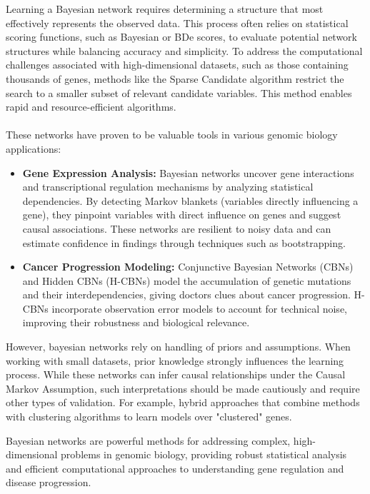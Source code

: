 Learning a Bayesian network requires determining a structure that most effectively represents the observed data.
This process often relies on statistical scoring functions, such as Bayesian or BDe scores, to evaluate potential network structures while balancing accuracy and simplicity.
To address the computational challenges associated with high-dimensional datasets, such as those containing thousands of genes, methods like the Sparse Candidate algorithm restrict the search to a smaller subset of relevant candidate variables.
This method enables rapid and resource-efficient algorithms\cite{friedman_using_2000}.
\\\\
These networks have proven to be valuable tools in various genomic biology applications:
\begin{itemize}
    \item \textbf{Gene Expression Analysis:} Bayesian networks uncover gene interactions and transcriptional regulation mechanisms by analyzing statistical dependencies.
        By detecting Markov blankets (variables directly influencing a gene), they pinpoint variables with direct influence on genes and suggest causal associations.
        These networks are resilient to noisy data and can estimate confidence in findings through techniques such as bootstrapping.
    \item \textbf{Cancer Progression Modeling:} Conjunctive Bayesian Networks (CBNs) and Hidden CBNs (H-CBNs) model the accumulation of genetic mutations and their interdependencies, giving doctors clues about cancer progression.
        H-CBNs incorporate observation error models to account for technical noise, improving their robustness and biological relevance.
\end{itemize}

\noindent However, bayesian networks rely on handling of priors and assumptions.
When working with small datasets, prior knowledge strongly influences the learning process.
While these networks can infer causal relationships under the Causal Markov Assumption, such interpretations should be made cautiously and require other types of validation.
For example, hybrid approaches that combine methods with clustering algorithms to learn models over "clustered" genes\cite{friedman_using_2000}.

\noindent Bayesian networks are powerful methods for addressing complex, high-dimensional problems in genomic biology, providing robust statistical analysis and efficient computational approaches to understanding gene regulation and disease progression.


